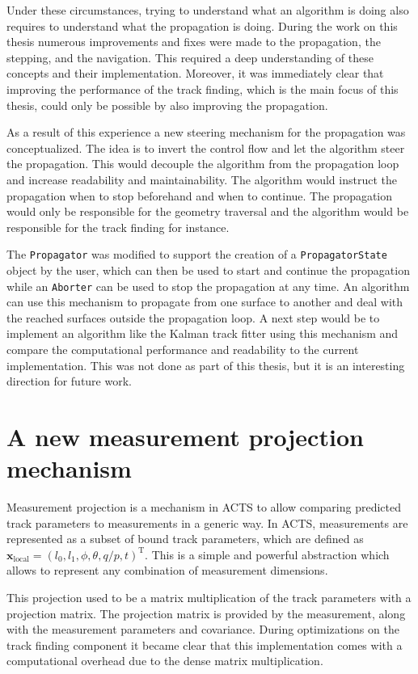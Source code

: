 Under these circumstances, trying to understand what an algorithm is doing also requires to understand what the propagation is doing. During the work on this thesis numerous improvements and fixes were made to the propagation, the stepping, and the navigation. This required a deep understanding of these concepts and their implementation. Moreover, it was immediately clear that improving the performance of the track finding, which is the main focus of this thesis, could only be possible by also improving the propagation.

As a result of this experience a new steering mechanism for the propagation was conceptualized. The idea is to invert the control flow and let the algorithm steer the propagation. This would decouple the algorithm from the propagation loop and increase readability and maintainability. The algorithm would instruct the propagation when to stop beforehand and when to continue. The propagation would only be responsible for the geometry traversal and the algorithm would be responsible for the track finding for instance.

The \texttt{Propagator} was modified to support the creation of a \texttt{PropagatorState} object by the user, which can then be used to start and continue the propagation while an \texttt{Aborter} can be used to stop the propagation at any time. An algorithm can use this mechanism to propagate from one surface to another and deal with the reached surfaces outside the propagation loop. A next step would be to implement an algorithm like the Kalman track fitter using this mechanism and compare the computational performance and readability to the current implementation. This was not done as part of this thesis, but it is an interesting direction for future work.

\section{A new measurement projection mechanism}
\label{sec:dev/general/measurement-projection}

Measurement projection is a mechanism in ACTS to allow comparing predicted track parameters to measurements in a generic way. In ACTS, measurements are represented as a subset of bound track parameters, which are defined as $\mathbf{x}_\text{local} = \left(l_0, l_1, \phi, \theta, q/p, t\right)^\mathrm{T}$. This is a simple and powerful abstraction which allows to represent any combination of measurement dimensions.

This projection used to be a matrix multiplication of the track parameters with a projection matrix. The projection matrix is provided by the measurement, along with the measurement parameters and covariance. During optimizations on the track finding component it became clear that this implementation comes with a computational overhead due to the dense matrix multiplication.

